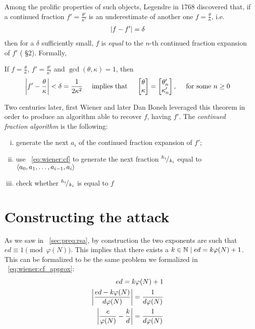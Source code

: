 Among the prolific properties of such objects, Legendre in 1768 discovered that,
if a continued fraction $f' = \frac{\theta'}{\kappa'}$ is
an underestimate of another one $f = \frac{\theta}{\kappa}$, i.e.
\begin{align}
  \left|f - f'\right| = \delta
\end{align}
then for a $\delta$ sufficiently small, $f$ is \emph{equal} to the $n$-th
continued fraction expansion of $f'$ (\cite{smeets} \S 2). Formally,

\begin{theorem*}[Legendre]
  If $f = \frac{\theta}{\kappa}$,  $f' = \frac{\theta'}{\kappa'}$ and
  $\gcd(\theta, \kappa) = 1$, then
  \begin{align}
  \label{eq:wiener:cf_approx}
    \left|f' - \frac{\theta}{\kappa}\right| < \delta = \frac{1}{2\kappa^2}
    \quad
    \text{ implies that }
    \quad
    \begin{bmatrix}
      \theta \\ \kappa
    \end{bmatrix}
    =
    \begin{bmatrix}
      \theta'_n \\ \kappa'_n
    \end{bmatrix},
    \quad
    \text{ for some } n \geq 0
  \end{align}
\end{theorem*}

Two centuries later, first Wiener \cite{wiener} and later Dan Boneh
\cite{20years} leveraged this theorem in order to produce an algorithm able to
recover $f$, having $f'$.
The \emph{continued fraction algorithm}  is the following:
\begin{enumerate}[(i)]
  \setlength{\itemsep}{1pt}
  \setlength{\parskip}{0pt}
  \setlength{\parsep}{0pt}
  \item generate the next $a_i$ of the continued fraction expansion of $f'$;
  \item use ~\ref{eq:wiener:cf} to generate the next fraction ${}^{h_i}\!/_{k_i}$
    equal to $\langle a_0, a_1, \ldots, a_{i-1}, a_i\rangle$ %
  \item check whether ${}^{h_i}\!/_{k_i}$ is equal to $f$
\end{enumerate}

\section{Constructing the attack}

As we saw in ~\ref{sec:preq:rsa}, by construction the two exponents are such that
$ed \equiv 1 \pmod{\varphi(N)}$. This implies that there exists a
$k \in \mathbb{N} \mid ed = k\varphi(N) + 1$. This can be formalized to be
the same problem we formalized in ~\ref{eq:wiener:cf_approx}:
\begin{align*}
  ed = k\varphi(N) + 1 \\
  \left|\frac{ed - k\varphi(N)}{d\varphi(N)}\right| = \frac{1}{d\varphi(N)} \\
  \left|\frac{e}{\varphi(N)} - \frac{k}{d}\right| = \frac{1}{d\varphi(N)} \\
\end{align*}

